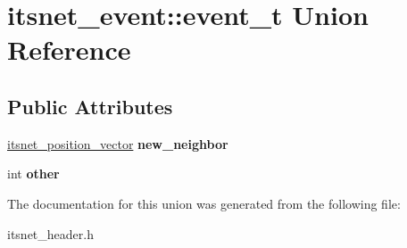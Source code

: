 \hypertarget{unionitsnet__event_1_1event__t}{\section{itsnet\-\_\-event\-:\-:event\-\_\-t \-Union \-Reference}
\label{unionitsnet__event_1_1event__t}
}
\subsection*{\-Public \-Attributes}
\begin{DoxyCompactItemize}
\item 
\hypertarget{unionitsnet__event_1_1event__t_a99ec07b7d21590083ba5c9c8cb0ba2b5}{\hyperlink{structitsnet__position__vector}{itsnet\-\_\-position\-\_\-vector} {\bfseries new\-\_\-neighbor}}\label{unionitsnet__event_1_1event__t_a99ec07b7d21590083ba5c9c8cb0ba2b5}

\item 
\hypertarget{unionitsnet__event_1_1event__t_ab31a341f9c6f60be70b529b18ebba0ca}{int {\bfseries other}}\label{unionitsnet__event_1_1event__t_ab31a341f9c6f60be70b529b18ebba0ca}

\end{DoxyCompactItemize}


\-The documentation for this union was generated from the following file\-:\begin{DoxyCompactItemize}
\item 
itsnet\-\_\-header.\-h\end{DoxyCompactItemize}
